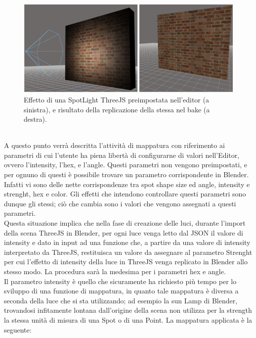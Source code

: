 \begin{figure}[htb]
 \centering
 \includegraphics[width=1\linewidth]{images/chapter_baking_service/ba_se_confronto_spot.png}\hfill
 \caption[SpotLight preimpostata]{Effetto di una SpotLight ThreeJS preimpostata nell'editor (a sinistra), e risultato della replicazione della stessa nel bake (a destra).}
 \label{fig:ba_se_confronto_spot}
\end{figure}
\\
A questo punto verrà descritta l’attività di mappatura con riferimento ai parametri di cui l’utente ha piena libertà di configurarne di valori nell’Editor, ovvero l’intensity, l’hex, e l’angle. Questi parametri non vengono preimpostati, e per ognuno di questi è possibile trovare un parametro corrispondente in Blender.
\\ 
Infatti vi sono delle nette corrispondenze tra spot shape size ed angle, intensity e strenght, hex e color. Gli effetti che intendono controllare questi parametri sono dunque gli stessi; ciò che cambia sono i valori che vengono assegnati a questi parametri.
\\
Questa situazione implica che nella fase di creazione delle luci, durante l’import della scena ThreeJS in Blender, per ogni luce venga letto dal JSON il valore di intensity e dato in input ad una funzione che, a partire da una valore di intensity interpretato da ThreeJS, restituisca un valore da assegnare al parametro Strenght per cui l’effetto di intensity della luce in ThreeJS venga replicato in Blender allo stesso modo. La procedura sarà la medesima per i parametri hex e angle.
\\ 
Il parametro intensity è quello che sicuramente ha richiesto più tempo per lo sviluppo di una funzione di mappatura, in quanto tale mappatura è diversa a seconda della luce che si sta utilizzando; ad esempio la sun Lamp di Blender, trovandosi infitamente lontana dall’origine della scena non utilizza per la strength la stessa unità di misura di una Spot o di una Point. La mappatura applicata è la seguente:
